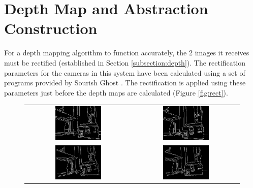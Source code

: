 \section{Depth Map and Abstraction Construction}
\label{section:depth}

For a depth mapping algorithm to function accurately, the 2 images it receives must be rectified (established in Section \ref{subsection:depth}). The rectification parameters for the cameras in this system have been calculated using a set of programs provided by Sourish Ghost \cite{calibgit}. The rectification is applied using these parameters just before the depth maps are calculated (Figure \ref{fig:rect}).

\begin{figure}[H]
    \begin{center}
    \begin{tabular}{ c c }
        \includegraphics[width=0.45\textwidth]{Figures/prerectL.jpg} &
        \includegraphics[width=0.45\textwidth]{Figures/prerectR.jpg} \\
        \includegraphics[width=0.45\textwidth]{Figures/postrectL.jpg} &
        \includegraphics[width=0.45\textwidth]{Figures/postrectR.jpg}

\end{tabular}
\end{center}
\end{figure}
